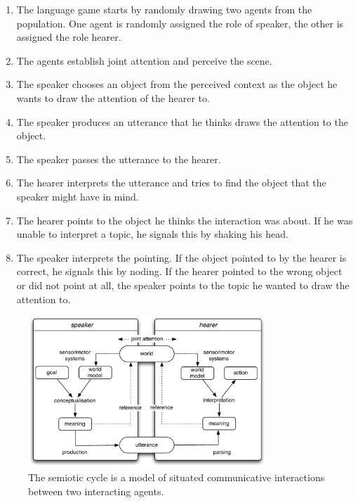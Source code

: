 \begin{enumerate}
\item The language game starts by randomly drawing two agents from the population. 
One agent is randomly assigned the role of speaker, the other is assigned the role
hearer.
\item The agents establish joint attention and perceive the scene.
\item The speaker chooses an object from the perceived context as the object
he wants to draw the attention of the hearer to.
\item The speaker produces an utterance that he thinks draws the attention to the object.
\item The speaker passes the utterance to the hearer.
\item The hearer interprets the utterance and tries to find the object that the speaker
might have in mind. 
\item The hearer points to the object he thinks the interaction was about. If he was unable 
to interpret a topic, he signals this by shaking his head.
\item The speaker interprets the pointing. If the object pointed to by the hearer
is correct, he signals this by noding. If the hearer pointed to the wrong object or
did not point at all, the speaker
points to the topic he wanted to draw the attention to.
\end{enumerate}


\begin{figure}
\begin{center}
\includegraphics[width=0.8\textwidth]{figs/semiotic-cycle}
\caption[Semiotic cycle]{The semiotic cycle is a model of situated communicative interactions between 
two interacting agents.}
\end{center}
\label{f:semiotic-cycle}
\end{figure}


